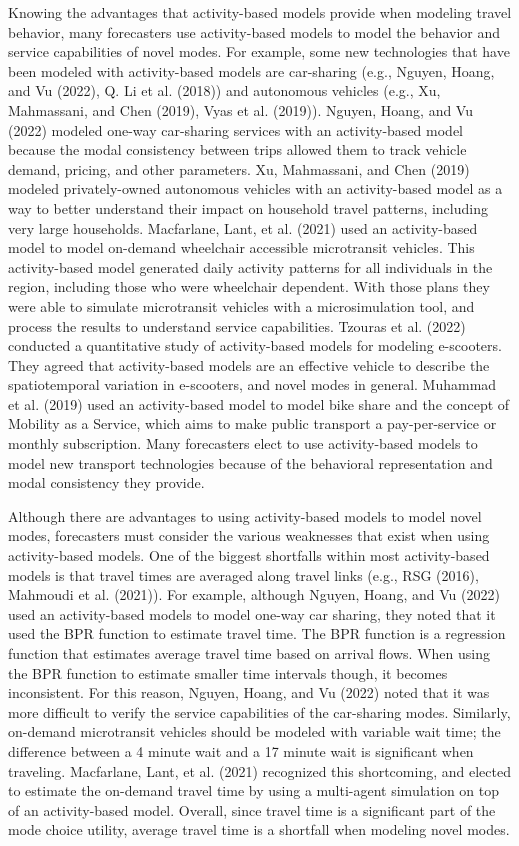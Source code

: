 \documentclass[12pt, oneside, openright]{byuthesis}
\begin{document}
Knowing the advantages that activity-based models provide when modeling travel behavior, many forecasters use activity-based models to model the behavior and service capabilities of novel modes. For example, some new technologies that have been modeled with activity-based models are car-sharing (e.g., Nguyen, Hoang, and Vu (2022), Q. Li et al. (2018)) and autonomous vehicles (e.g., Xu, Mahmassani, and Chen (2019), Vyas et al. (2019)). Nguyen, Hoang, and Vu (2022) modeled one-way car-sharing services with an activity-based model because the modal consistency between trips allowed them to track vehicle demand, pricing, and other parameters. Xu, Mahmassani, and Chen (2019) modeled privately-owned autonomous vehicles with an activity-based model as a way to better understand their impact on household travel patterns, including very large households. Macfarlane, Lant, et al. (2021) used an activity-based model to model on-demand wheelchair accessible microtransit vehicles. This activity-based model generated daily activity patterns for all individuals in the region, including those who were wheelchair dependent. With those plans they were able to simulate microtransit vehicles with a microsimulation tool, and process the results to understand service capabilities. Tzouras et al. (2022) conducted a quantitative study of activity-based models for modeling e-scooters. They agreed that activity-based models are an effective vehicle to describe the spatiotemporal variation in e-scooters, and novel modes in general. Muhammad et al. (2019) used an activity-based model to model bike share and the concept of Mobility as a Service, which aims to make public transport a pay-per-service or monthly subscription. Many forecasters elect to use activity-based models to model new transport technologies because of the behavioral representation and modal consistency they provide.

Although there are advantages to using activity-based models to model novel modes, forecasters must consider the various weaknesses that exist when using activity-based models. One of the biggest shortfalls within most activity-based models is that travel times are averaged along travel links (e.g., RSG (2016), Mahmoudi et al. (2021)). For example, although Nguyen, Hoang, and Vu (2022) used an activity-based models to model one-way car sharing, they noted that it used the BPR function to estimate travel time. The BPR function is a regression function that estimates average travel time based on arrival flows. When using the BPR function to estimate smaller time intervals though, it becomes inconsistent. For this reason, Nguyen, Hoang, and Vu (2022) noted that it was more difficult to verify the service capabilities of the car-sharing modes. Similarly, on-demand microtransit vehicles should be modeled with variable wait time; the difference between a 4 minute wait and a 17 minute wait is significant when traveling. Macfarlane, Lant, et al. (2021) recognized this shortcoming, and elected to estimate the on-demand travel time by using a multi-agent simulation on top of an activity-based model. Overall, since travel time is a significant part of the mode choice utility, average travel time is a shortfall when modeling novel modes.
\end{document}
